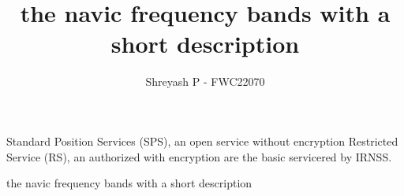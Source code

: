 \documentclass{article}
\begin{document}
\title{the navic frequency bands with a short description}
\author{\Large Shreyash P - FWC22070}
\date{}

\maketitle



Standard Position Services (SPS), an open service without encryption Restricted Service (RS), an authorized with encryption are the basic servicered by IRNSS.
		
	\begin{table}[h!]
	\small
	\centering
	
	\end{table}

		the navic frequency bands with a short description	%

\end{document}
